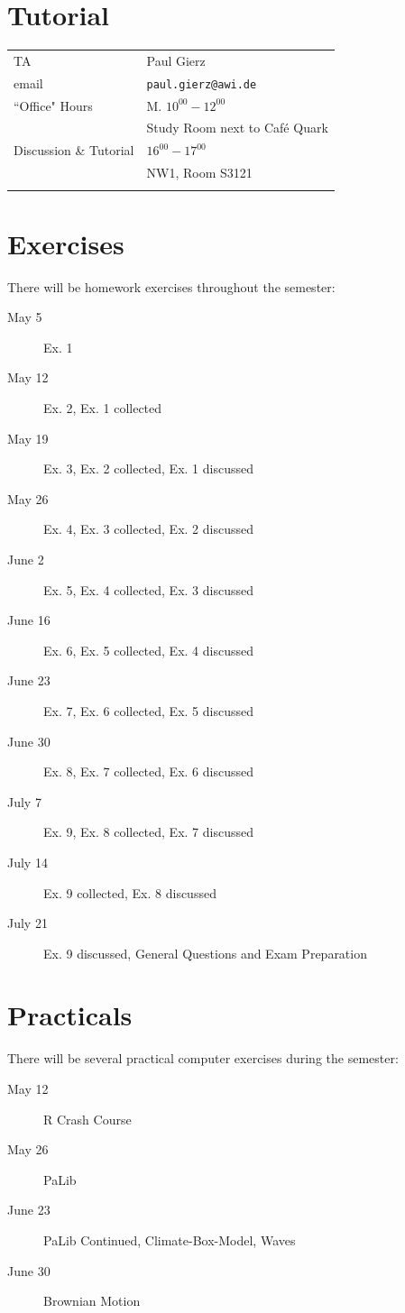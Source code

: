 \documentclass[11pt]{article}
\begin{document}
\section*{Tutorial}
\begin{tabular}{>{\hfill}p{5cm}|p{11cm}}
	TA & Paul Gierz \\
	email & \texttt{paul.gierz@awi.de}\\
    ``Office" Hours & M. $10^{00}-12^{00}$ \\
	& Study Room next to Caf\'{e} Quark \\
	Discussion \& Tutorial & $16^{00}-17^{00}$ \\
	& NW1, Room S3121 \\
	\multicolumn{2}{c}{} 
\end{tabular}

\section*{Exercises}
There will be homework exercises throughout the semester:
\begin{description}
\item[May 5] Ex. 1 
\item[May 12] Ex. 2, Ex. 1 collected
\item[May 19] Ex. 3, Ex. 2 collected, Ex. 1 discussed
\item[May 26] Ex. 4, Ex. 3 collected, Ex. 2 discussed
\item[June 2] Ex. 5, Ex. 4 collected, Ex. 3 discussed
\item[June 16] Ex. 6, Ex. 5 collected, Ex. 4 discussed
\item[June 23] Ex. 7, Ex. 6 collected, Ex. 5 discussed
\item[June 30] Ex. 8, Ex. 7 collected, Ex. 6 discussed
\item[July 7] Ex. 9, Ex. 8 collected, Ex. 7 discussed
\item[July 14] Ex. 9 collected, Ex. 8 discussed
\item[July 21] Ex. 9 discussed, General Questions and Exam Preparation
\end{description}

\section*{Practicals}
There will be several practical computer exercises during the semester:
\begin{description}
\item[May 12] R Crash Course 
\item[May 26] PaLib
\item[June 23] PaLib Continued, Climate-Box-Model, Waves
\item[June 30] Brownian Motion
\end{description}
\end{document}
